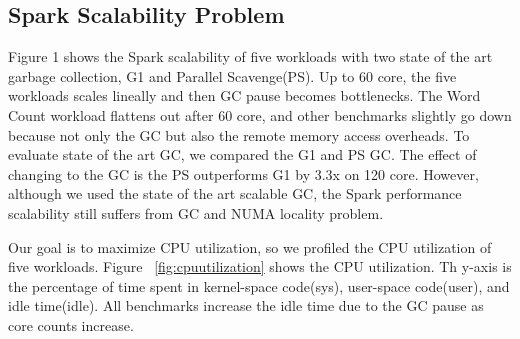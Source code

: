 

\subsection{Spark Scalability Problem}
Figure 1 shows the Spark scalability of five workloads with two state of the art garbage
collection, G1 and Parallel Scavenge(PS).
Up to 60 core, the five workloads scales lineally and then GC pause becomes bottlenecks.
The Word Count workload flattens out after 60 core, and other benchmarks slightly go
down because not only the GC but also the remote memory access overheads. 
To evaluate state of the art GC, we compared the G1 and PS GC.
The effect of changing to the GC is the PS outperforms G1 by 3.3x on 120 core.
However, although we used the state of the art scalable GC,
the Spark performance scalability still suffers from GC and NUMA locality problem.


Our goal is to maximize CPU utilization, so we profiled the CPU utilization of five workloads.
Figure ~\ref{fig:cpuutilization} shows the CPU utilization.
Th y-axis is the percentage of time spent in kernel-space code(sys), user-space
code(user), and idle time(idle).
All benchmarks increase the idle time due to the GC pause as core counts increase.

